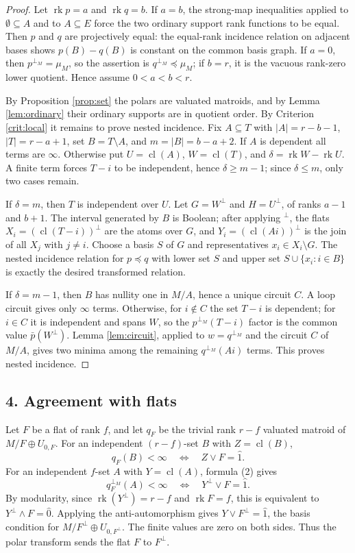 \documentclass[12pt]{article}
\newcommand{\rk}{\operatorname{rk}}
\newcommand{\cl}{\operatorname{cl}}
\begin{document}
\begin{proof}
Let $\rk p=a$ and $\rk q=b$.  If $a=b$, the strong-map inequalities applied to
$\emptyset\subseteq A$ and to $A\subseteq E$ force the two ordinary
support rank functions to be equal.  Then $p$ and $q$ are projectively
equal: the equal-rank incidence relation on adjacent bases shows
$p(B)-q(B)$ is constant on the common basis graph.  If $a=0$, then $p^{\perp_M}=\mu_M$, so the
assertion is $q^{\perp_M}\preceq\mu_M$; if $b=r$, it is the vacuous
rank-zero lower quotient.  Hence assume $0<a<b<r$.

By Proposition \ref{prop:set} the polars are valuated matroids, and by
Lemma \ref{lem:ordinary} their ordinary supports are in quotient order.
By Criterion \ref{crit:local} it remains to prove nested incidence.
Fix $A\subseteq T$ with
$|A|=r-b-1$, $|T|=r-a+1$, set $B=T\setminus A$, and
$m=|B|=b-a+2$.  If $A$ is dependent all terms are $\infty$.  Otherwise
put $U=\cl(A)$, $W=\cl(T)$, and $\delta=\rk W-\rk U$.  A finite term
forces $T-i$ to be independent, hence $\delta\ge m-1$; since
$\delta\le m$, only two cases remain.

If $\delta=m$, then $T$ is independent over $U$.  Let $G=W^\perp$ and
$H=U^\perp$, of ranks $a-1$ and $b+1$.  The interval generated by $B$
is Boolean; after applying $^\perp$, the flats
$X_i=(\cl(T-i))^\perp$ are the atoms over $G$, and
$Y_i=(\cl(Ai))^\perp$ is the join of all $X_j$ with $j\ne i$.  Choose a
basis $S$ of $G$ and representatives $x_i\in X_i\setminus G$.  The
nested incidence relation for $p\preceq q$ with lower set $S$ and upper
set $S\cup\{x_i:i\in B\}$ is exactly the desired transformed relation.

If $\delta=m-1$, then $B$ has nullity one in $M/A$, hence a unique
circuit $C$.  A loop circuit gives only $\infty$ terms.  Otherwise, for
$i\notin C$ the set $T-i$ is dependent; for $i\in C$ it is independent
and spans $W$, so the $p^{\perp_M}(T-i)$ factor is the common value
$\bar p(W^\perp)$.  Lemma \ref{lem:circuit}, applied to
$w=q^{\perp_M}$ and the circuit $C$ of $M/A$, gives two minima among
the remaining $q^{\perp_M}(Ai)$ terms.  This proves nested incidence.
\end{proof}

\subsection*{4. Agreement with flats}

Let $F$ be a flat of rank $f$, and let $q_F$ be the trivial rank
$r-f$ valuated matroid of $M/F\oplus U_{0,F}$.  For an independent
$(r-f)$-set $B$ with $Z=\cl(B)$,
\[
        q_F(B)<\infty\quad\Longleftrightarrow\quad Z\vee F=\hat1.
\]
For an independent $f$-set $A$ with $Y=\cl(A)$, formula (2) gives
\[
 q_F^{\perp_M}(A)<\infty
 \quad\Longleftrightarrow\quad Y^\perp\vee F=\hat1 .
\]
By modularity, since $\rk(Y^\perp)=r-f$ and $\rk F=f$, this is
equivalent to $Y^\perp\wedge F=\hat0$.  Applying the anti-automorphism
gives $Y\vee F^\perp=\hat1$, the basis condition for
$M/F^\perp\oplus U_{0,F^\perp}$.  The finite values are zero on both
sides.  Thus the polar transform sends the flat $F$ to $F^\perp$.
\end{document}
